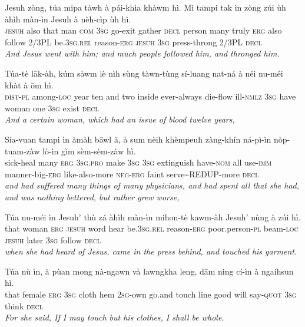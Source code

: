 \documentclass[11pt,a4paper]{article}
\begin{document}
\begin{exe}
\gll Jesuh zòng, túa mipa tàwh à pái-khìa khàwm hì. Mì tampi tak ìn zòng zúi ùh àhìh màn-ìn Jesuh à nèh-cìp ùh hì. \\
     \textsc{jesuh} also that man \textsc{com} \textsc{3sg} go-exit gather \textsc{decl} person many truly \textsc{erg} also follow 2/3PL be.\textsc{3sg}.\textsc{rel} reason-\textsc{erg} \textsc{jesuh} \textsc{3sg} press-throng 2/3PL \textsc{decl} \\
\glt \textcolor{kjvcolor}{\textit{And Jesus went with him; and much people followed him, and thronged him.}}

\gll Túa-tè lāk-àh, kúm sàwm lè nìh sùng tàwn-tùng sí-luang nat-ná à néi nu-méi khàt à ōm hì. \\
     \textsc{dist}-\textsc{pl} among-\textsc{loc} year ten and two inside ever-always die-flow ill-\textsc{nmlz} \textsc{3sg} have woman one \textsc{3sg} exist \textsc{decl} \\
\glt \textcolor{kjvcolor}{\textit{And a certain woman, which had an issue of blood twelve years,}}

\gll Sía-vuan tampi ìn àmàh bāwl à, à sum nèih khèmpeuh zàng-khín ná-pì-ìn nòp-tuam-zàw lò-ìn gìm sèm-sèm-zàw hì. \\
     sick-heal many \textsc{erg} \textsc{3sg}.\textsc{pro} make \textsc{3sg} \textsc{3sg} extinguish have-\textsc{nom} all use-\textsc{imm} manner-big-\textsc{erg} like-also-more \textsc{neg}-\textsc{erg} faint serve\textasciitilde{}REDUP-more \textsc{decl} \\
\glt \textcolor{kjvcolor}{\textit{and had suffered many things of many physicians, and had spent all that she had, and was nothing bettered, but rather grew worse,}}

\gll Túa nu-méi ìn Jesuh' thù zá àhìh màn-ìn mihon-tè kawm-àh Jesuh' nùng à zúi hì. \\
     that woman \textsc{erg} \textsc{jesuh} word hear be.\textsc{3sg}.\textsc{rel} reason-\textsc{erg} poor.person-\textsc{pl} beam-\textsc{loc} \textsc{jesuh} later \textsc{3sg} follow \textsc{decl} \\
\glt \textcolor{kjvcolor}{\textit{when she had heard of Jesus, came in the press behind, and touched his garment.}}

\gll Túa nù ìn, à pùan mong nà-ngawn và lawngkha leng, dām ning cí-ìn à ngaihsun hì. \\
     that female \textsc{erg} \textsc{3sg} cloth hem \textsc{2sg}-own go.and touch line good will say-\textsc{quot} \textsc{3sg} think \textsc{decl} \\
\glt \textcolor{kjvcolor}{\textit{For she said, If I may touch but his clothes, I shall be whole.}}


\end{exe}
\end{document}
